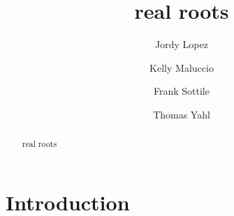 \documentclass[12pt]{amsart}
\title{real roots}
\author[J.~Lopez]{Jordy Lopez}
\author[K.~Maluccio]{Kelly Maluccio}
\author[F.~Sottile]{Frank Sottile}
\author[T.~Yahl]{Thomas Yahl}
\theoremstyle{definition}
\begin{document}
\begin{abstract}
real roots 
\end{abstract}

\maketitle


\section{Introduction}


\section{}


\section{}



%

\end{document}
